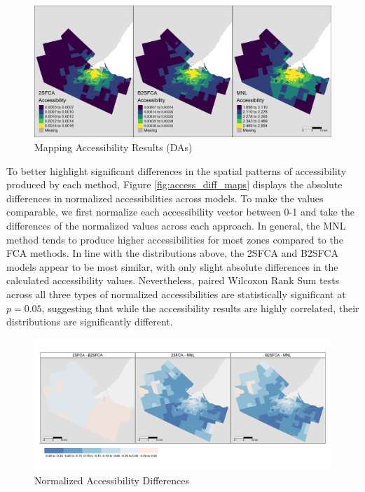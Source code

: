 \documentclass[]{elsarticle} %
\begin{document}
\begin{figure}
\includegraphics[width=1\linewidth]{./img/access_maps} \caption{\label{fig:access_maps}Mapping Accessibility Results (DAs)}\label{fig:fig 5 access_maps}
\end{figure}

To better highlight significant differences in the spatial patterns of
accessibility produced by each method, Figure \ref{fig:access_diff_maps}
displays the absolute differences in normalized accessibilities across
models. To make the values comparable, we first normalize each
accessibility vector between 0-1 and take the differences of the
normalized values across each approach. In general, the MNL method tends
to produce higher accessibilities for most zones compared to the FCA
methods. In line with the distributions above, the 2SFCA and B2SFCA
models appear to be most similar, with only slight absolute differences
in the calculated accessibility values. Nevertheless, paired Wilcoxon
Rank Sum tests across all three types of normalized accessibilities are
statistically significant at \(p=0.05\), suggesting that while the
accessibility results are highly correlated, their distributions are
significantly different.

\begin{figure}
\includegraphics[width=1\linewidth]{./img/access_diff_maps} \caption{\label{fig:access_diff_maps}Normalized Accessibility Differences}\label{fig:fig 6 access_diff_maps}
\end{figure}
\end{document}
